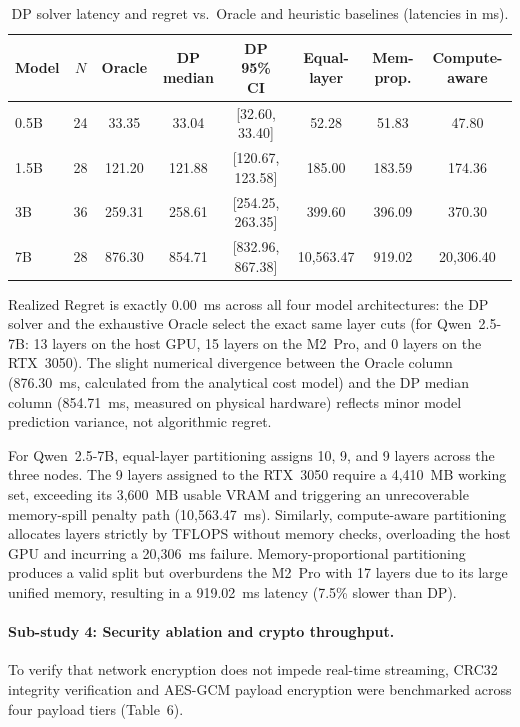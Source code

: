 \documentclass[10pt,a4paper]{article}
\begin{document}
\begin{table}[H]
\centering\footnotesize
\caption{DP solver latency and regret vs.\ Oracle and heuristic baselines (latencies in ms).}\label{tab:core}
\begin{tabular}{@{}lccccccc@{}}
\toprule
Model & $N$ & Oracle & DP median & DP 95\% CI & Equal-layer & Mem-prop. & Compute-aware\\
\midrule
0.5B & 24 & 33.35 & 33.04 & [32.60, 33.40] & 52.28 & 51.83 & 47.80\\
1.5B & 28 & 121.20 & 121.88 & [120.67, 123.58] & 185.00 & 183.59 & 174.36\\
3B & 36 & 259.31 & 258.61 & [254.25, 263.35] & 399.60 & 396.09 & 370.30\\
7B & 28 & 876.30 & 854.71 & [832.96, 867.38] & 10{,}563.47 & 919.02 & 20{,}306.40\\
\bottomrule
\end{tabular}
\end{table}

Realized Regret is exactly 0.00~ms across all four model architectures: the DP solver and the exhaustive Oracle select the exact same layer cuts (for Qwen~2.5-7B: 13 layers on the host GPU, 15 layers on the M2~Pro, and 0 layers on the RTX~3050). The slight numerical divergence between the Oracle column (876.30~ms, calculated from the analytical cost model) and the DP median column (854.71~ms, measured on physical hardware) reflects minor model prediction variance, not algorithmic regret.

For Qwen~2.5-7B, equal-layer partitioning assigns 10, 9, and 9 layers across the three nodes. The 9 layers assigned to the RTX~3050 require a 4{,}410~MB working set, exceeding its 3{,}600~MB usable VRAM and triggering an unrecoverable memory-spill penalty path (10{,}563.47~ms). Similarly, compute-aware partitioning allocates layers strictly by TFLOPS without memory checks, overloading the host GPU and incurring a 20{,}306~ms failure. Memory-proportional partitioning produces a valid split but overburdens the M2~Pro with 17 layers due to its large unified memory, resulting in a 919.02~ms latency (7.5\% slower than DP).

\paragraph{Sub-study 4: Security ablation and crypto throughput.}
To verify that network encryption does not impede real-time streaming, CRC32 integrity verification and AES-GCM payload encryption were benchmarked across four payload tiers (Table~6).
\end{document}
